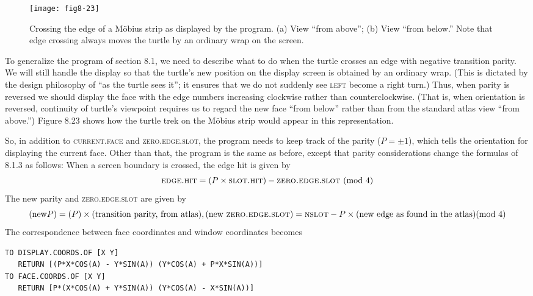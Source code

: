 \documentclass{book}
\begin{document}
\begin{figure}
\begin{center}
\texttt{[image: fig8-23]}
\caption{Crossing the edge of a M\"obius strip as displayed by the program. (a) View ``from above''; (b) View ``from below.'' Note that edge crossing always moves the turtle by an ordinary wrap on the screen.}
\end{center}
\end{figure}

To generalize the program of section 8.1, we need to describe what
to do when the turtle crosses an edge with negative transition parity.
We will still handle the display so that the turtle's new position on the
display screen is obtained by an ordinary wrap. (This is dictated by the
design philosophy of ``as the turtle sees it''; it ensures that we do not
suddenly see \textsc{left} become a right turn.) Thus, when parity is reversed
we should display the face with the edge numbers increasing clockwise
rather than counterclockwise. (That is, when orientation is reversed,
continuity of turtle's viewpoint requires us to regard the new face ``from
below'' rather than from the standard atlas view ``from above.'') Figure
8.23 shows how the turtle trek on the M\"obius strip would appear in this
representation.

So, in addition to \textsc{current}\textsc{.face} and \textsc{zero}\textsc{.edge}\textsc{.slot}, the program
needs to keep track of the parity ($P = \pm 1$), which tells the orientation
for displaying the current face. Other than that, the program is the
same as before, except that parity considerations change the formulas
of 8.1.3 as follows: When a screen boundary is crossed, the edge hit is
given by
$$\text{\textsc{edge}\textsc{.hit}} = (P \times \text{\textsc{slot}\textsc{.hit}})- \text{\textsc{zero}\textsc{.edge}\textsc{.slot} (mod 4)}$$
The new parity and \textsc{zero}\textsc{.edge}\textsc{.slot} are given by
$$(\text{new} P) = (P) \times (\text{transition parity, from atlas}), (\text{new \textsc{zero.edge.slot}}) = \text{\textsc{nslot}}- P \times (\text{new edge as found in the atlas}) (\text{mod 4})$$
 The correspondence between face coordinates and window coordinates
becomes

\begin{verbatim}
TO DISPLAY.COORDS.OF [X Y]
   RETURN [(P*X*COS(A) - Y*SIN(A)) (Y*COS(A) + P*X*SIN(A))]
TO FACE.COORDS.OF [X Y]
   RETURN [P*(X*COS(A) + Y*SIN(A)) (Y*COS(A) - X*SIN(A))]
\end{verbatim}
\end{document}
